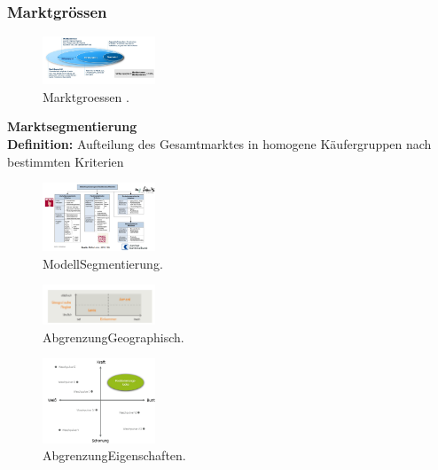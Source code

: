 \documentclass{article}
\begin{document}
\subsubsection{Marktgrössen}
\begin{figure}[H]
\centering
\includegraphics[width=0.3\textwidth]{Resources/Image/Marktgroessen.png}
\caption{\label{fig:BegriffMarketing}Marktgroessen .}
\end{figure}

\textbf{Marktsegmentierung}\\

\textbf{Definition: } Aufteilung des Gesamtmarktes in homogene Käufergruppen nach bestimmten Kriterien

\begin{multicols}{3}

\begin{figure}[H]
\centering
\includegraphics[width=0.3\textwidth]{Resources/Image/ModellSegmentierung.png}
\caption{\label{fig:ModellSegmentierung}ModellSegmentierung.}
\end{figure}


\columnbreak
\begin{figure}[H]
\centering
\includegraphics[width=0.3\textwidth]{Resources/Image/AbgrenzungGeographisch.png}
\caption{\label{fig:BegriffMarketing}AbgrenzungGeographisch.}
\end{figure}

\columnbreak
\begin{figure}[H]
\centering
\includegraphics[width=0.3\textwidth]{Resources/Image/AbgrenzungEigenschaften.png}
\caption{\label{fig:AbgrenzungEigenschaften}AbgrenzungEigenschaften.}
\end{figure}



\end{multicols}
\end{document}
